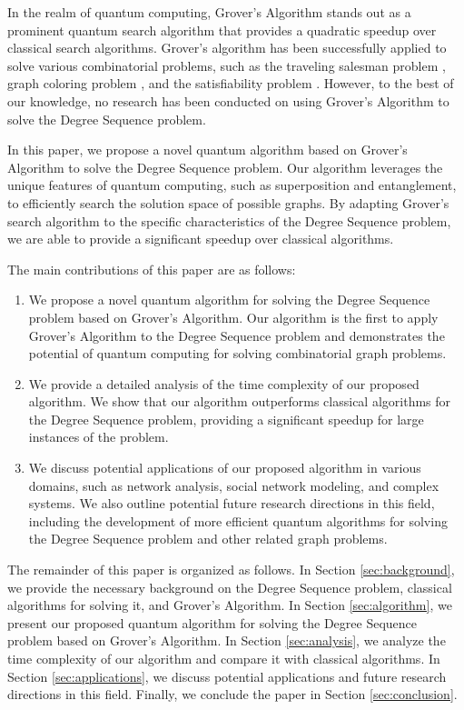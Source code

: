 In the realm of quantum computing, Grover's Algorithm \cite{grover} stands out as a prominent quantum search algorithm that provides a quadratic speedup over classical search algorithms. Grover's algorithm has been successfully applied to solve various combinatorial problems, such as the traveling salesman problem \cite{tsp_grover}, graph coloring problem \cite{graph_color_grover}, and the satisfiability problem \cite{sat_grover}. However, to the best of our knowledge, no research has been conducted on using Grover's Algorithm to solve the Degree Sequence problem.

In this paper, we propose a novel quantum algorithm based on Grover's Algorithm to solve the Degree Sequence problem. Our algorithm leverages the unique features of quantum computing, such as superposition and entanglement, to efficiently search the solution space of possible graphs. By adapting Grover's search algorithm to the specific characteristics of the Degree Sequence problem, we are able to provide a significant speedup over classical algorithms. 

The main contributions of this paper are as follows:

\begin{enumerate}
    \item We propose a novel quantum algorithm for solving the Degree Sequence problem based on Grover's Algorithm. Our algorithm is the first to apply Grover's Algorithm to the Degree Sequence problem and demonstrates the potential of quantum computing for solving combinatorial graph problems.
    \item We provide a detailed analysis of the time complexity of our proposed algorithm. We show that our algorithm outperforms classical algorithms for the Degree Sequence problem, providing a significant speedup for large instances of the problem.
    \item We discuss potential applications of our proposed algorithm in various domains, such as network analysis, social network modeling, and complex systems. We also outline potential future research directions in this field, including the development of more efficient quantum algorithms for solving the Degree Sequence problem and other related graph problems.
\end{enumerate}

The remainder of this paper is organized as follows. In Section \ref{sec:background}, we provide the necessary background on the Degree Sequence problem, classical algorithms for solving it, and Grover's Algorithm. In Section \ref{sec:algorithm}, we present our proposed quantum algorithm for solving the Degree Sequence problem based on Grover's Algorithm. In Section \ref{sec:analysis}, we analyze the time complexity of our algorithm and compare it with classical algorithms. In Section \ref{sec:applications}, we discuss potential applications and future research directions in this field. Finally, we conclude the paper in Section \ref{sec:conclusion}.

